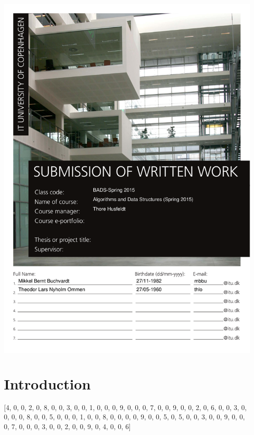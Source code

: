 




\includegraphics[scale=0.7]{./frontpage}

\begingroup
\let\flushleft
\let\endcenter\endflushleft
\maketitle
\endgroup



\section{Introduction}

[4, 0, 0, 2, 0, 8, 0, 0, 3, 0, 0, 1, 0, 0, 0, 9, 0, 0, 0, 7, 0, 0, 9, 0, 0, 2, 0, 6, 0, 0, 3, 0, 0, 0, 0, 8, 0, 0, 5, 0, 0, 0, 1, 0, 0, 8, 0, 0, 0, 0, 9, 0, 0, 5, 0, 5, 0, 0, 3, 0, 0, 9, 0, 0, 0, 7, 0, 0, 0, 3, 0, 0, 2, 0, 0, 9, 0, 4, 0, 0, 6]



